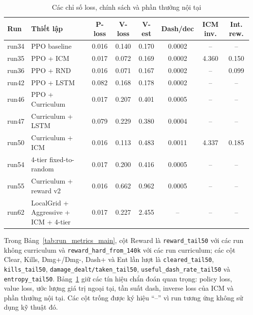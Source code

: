 \begin{table}[H]
    \centering
    \scriptsize
    \setlength{\tabcolsep}{5pt}
    \renewcommand{\arraystretch}{1.15}
    \caption{Các chỉ số loss, chính sách và phần thưởng nội tại}
    \label{tab:run_metrics_aux}
    \begin{tabular}{l p{3.5cm} c c c c c c}
        \toprule
        \textbf{Run} & \textbf{Thiết lập} & \textbf{P-loss} & \textbf{V-loss} & \textbf{V-est} & \textbf{Dash/dec} & \textbf{ICM inv.} & \textbf{Int. rew.} \\
        \midrule
        run34 & PPO baseline & 0.016 & 0.140 & 0.170 & 0.0002 & -- & -- \\
        run35 & PPO + ICM & 0.017 & 0.072 & 0.169 & 0.0002 & 4.360 & 0.150 \\
        run36 & PPO + RND & 0.016 & 0.071 & 0.167 & 0.0002 & -- & 0.099 \\
        run42 & PPO + LSTM & 0.082 & 0.168 & 0.178 & 0.0002 & -- & -- \\
        run46 & PPO + Curriculum & 0.017 & 0.207 & 0.401 & 0.0005 & -- & -- \\
        run47 & Curriculum + LSTM & 0.079 & 0.229 & 0.380 & 0.0004 & -- & -- \\
        run50 & Curriculum + ICM & 0.016 & 0.113 & 0.483 & 0.0011 & 4.337 & 0.185 \\
        run54 & 4-tier fixed-to-random & 0.017 & 0.200 & 0.416 & 0.0005 & -- & -- \\
        run55 & Curriculum + reward v2 & 0.016 & 0.662 & 0.962 & 0.0005 & -- & -- \\
        run62 & LocalGrid + Aggressive + ICM + 4-tier & 0.017 & 0.227 & 2.455 & -- & -- & -- \\
        \bottomrule
    \end{tabular}
\end{table}

Trong Bảng~\ref{tab:run_metrics_main}, cột Reward là \texttt{reward\_tail50} với các run không curriculum và \texttt{reward\_hard\_from\_140k} với các run curriculum; các cột Clear, Kills, Dmg+/Dmg-, Dash+ và Ent lần lượt là \texttt{cleared\_tail50}, \texttt{kills\_tail50}, \texttt{damage\_dealt/taken\_tail50}, \texttt{useful\_dash\_rate\_tail50} và \texttt{entropy\_tail50}. Bảng~\ref{tab:run_metrics_aux} giữ các tín hiệu chẩn đoán quan trọng: policy loss, value loss, ước lượng giá trị ngoại tại, tần suất dash, inverse loss của ICM và phần thưởng nội tại. Các cột trống được ký hiệu ``--'' vì run tương ứng không sử dụng kỹ thuật đó.

